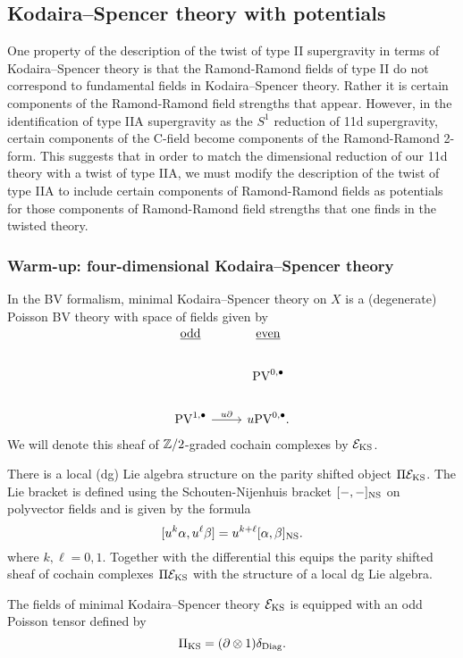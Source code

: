 \documentclass[11pt]{amsart}
\def\PV{{\rm PV}}
\begin{document}
\subsection{Kodaira--Spencer theory with potentials}
\label{KSPot}

One property of the description of the twist of type II supergravity in terms of Kodaira--Spencer theory is that the Ramond-Ramond fields of type II do not correspond to fundamental fields in Kodaira--Spencer theory. Rather it is certain components of the Ramond-Ramond field strengths that appear. However, in the identification of type IIA supergravity as the $S^{1}$ reduction of 11d supergravity, certain components of the C-field become components of the Ramond-Ramond 2-form. This suggests that in order to match the dimensional reduction of our 11d theory with a twist of type IIA, we must modify the description of the twist of type IIA to include certain components of Ramond-Ramond fields as potentials for those components of Ramond-Ramond field strengths that one finds in the twisted theory.

\subsubsection{Warm-up: four-dimensional Kodaira--Spencer theory}
\label{sec:org91dc4ca}
In the BV formalism, minimal Kodaira--Spencer theory on $X$ is a (degenerate) Poisson BV theory with space of fields given by
\[
\begin{tikzcd}
\ul{\rm odd} & \ul{\rm even} \\
 & \PV^{0,\bu} \\
 \PV^{1,\bu} \ar[r, "u \partial"] & u \PV^{0,\bu} .
\end{tikzcd}
\]
We will denote this sheaf of $\mathbb Z /2$-graded cochain complexes by $\mathcal E_{\rm KS}$.

There is a local (dg) Lie algebra structure on the parity shifted object $\Pi \mathcal E_{\rm KS}$.
The Lie bracket is defined using the Schouten-Nijenhuis bracket $[-,-]_{\rm NS}$ on polyvector fields and is given by the formula
\[
[u^k \alpha , u^\ell \beta] = u^{k+\ell} [\alpha, \beta]_{\rm NS} .
\]
where $k, \ell = 0,1$.
Together with the differential this equips the parity shifted sheaf of cochain complexes $\Pi \mathcal E_{\rm KS}$ with the structure of a local dg Lie algebra.

The fields of minimal Kodaira--Spencer theory $\mathcal E_{\rm KS}$ is equipped with an odd Poisson tensor defined by
\[
\Pi_{\rm KS} = (\partial \otimes 1) \delta_{\rm Diag} .
\]
\end{document}
